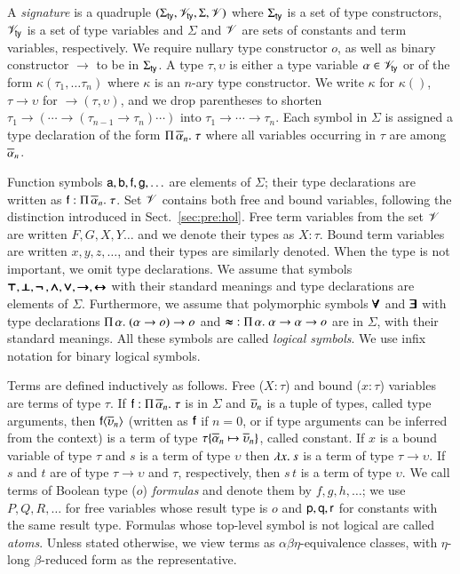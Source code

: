 A {\em signature} is a quadruple $(\Sigma_\mathsf{ty}, \mathscr{V}_\mathsf{ty}, \Sigma, \mathscr{V})$ where $\Sigma_\mathsf{ty}$ is a
set of type constructors, $\mathscr{V}_\mathsf{ty}$ is a set of type variables and $\Sigma$ and
$\mathscr{V}$ are sets of constants and term variables, respectively. We require nullary
type constructor $o$, as well as binary constructor $\rightarrow$
to be in $\Sigma_\mathsf{ty}$. A type $\tau, \upsilon$ is either a type variable $\alpha \in
\mathscr{V}_\mathsf{ty}$ or of the form $\kappa(\tau_1, \ldots \tau_n)$ where $\kappa$ is an
$n$-ary type constructor. We write $\kappa$ for $\kappa()$, $\tau \rightarrow
\upsilon$ for $\rightarrow(\tau, \upsilon)$, and we drop parentheses to shorten 
$\tau_1 \rightarrow (\cdots \rightarrow (\tau_{n-1} \rightarrow \tau_n) \cdots)$ into $\tau_1 \rightarrow \cdots \rightarrow
\tau_n$. Each symbol in $\Sigma$ is
assigned a type declaration of the form $\Pi\,\overline{\alpha}_{n}.\; \tau$ where all variables
occurring in $\tau$ are among $\overline{\alpha}_{n}$.

Function symbols $\mathsf{a}, \mathsf{b}, \mathsf{f}, \mathsf{g}, \ldots$ are elements of
$\Sigma$; their type declarations are written as $\mathsf{f} :
\Pi\,\overline{\alpha}_{n}.\; \tau$. Set $\mathscr{V}$ contains both free and bound variables, following
the distinction introduced in Sect.~\ref{sec:pre:hol}. Free term variables from the set $\mathscr{V}$ are written
$F,G,X,Y \ldots$ and we denote their types as $X : \tau$. Bound term variables are written $x,y,z,\ldots$,
and their types are similarly denoted. When the type is not
important, we omit type declarations. We assume that symbols $\pmb{\top},
\pmb{\bot},\pmb{\neg\,},\pmb{\land}, \pmb{\lor},\pmb{\rightarrow},\pmb{\leftrightarrow}$ with their standard meanings and type declarations are elements of
$\Sigma$. Furthermore, we assume that polymorphic symbols $\pmb{\forall}$ and $\pmb{\exists}$
with type declarations $\Pi\,\alpha.\; (\alpha \rightarrow o) \rightarrow o$
and $\pmb{\approx} \; : \Pi\,\alpha.\; {\alpha \rightarrow \alpha \rightarrow o}$ are
in $\Sigma$, with their standard meanings. All these symbols are called \emph{logical
symbols}. We use infix notation for binary logical symbols.

 Terms are defined inductively as follows. Free ($X : \tau$)  and bound ($x : \tau$) variables   are
terms of type $\tau$. If $\mathsf{f} : \Pi\,\overline{\alpha}_{n}.\; \tau$ is in
$\Sigma$ and $\overline{\upsilon}_{n}$ is a tuple of types, called type arguments, then
$\mathsf{f}{\langle\overline{\upsilon}_{n}\rangle}$ (written as $\mathsf{f}$ if $n=0$, or if type
arguments can be inferred from the context) is a term of type $\tau \{
\overline{\alpha}_{n} \mapsto \overline{\upsilon}_{n} \}$, called constant. If $x$ is a bound variable
of type $\tau$ and $s$ is a term of type $\upsilon$ then $\lambda x.\> s$ is a term of type
$\tau \rightarrow \upsilon$. If $s$ and $t$ are of type $\tau \rightarrow \upsilon$ and
$\tau$, respectively, then $s \, t$ is a term of type $\upsilon$. We call terms of
Boolean type ($o$) \emph{formulas} and denote them by $f,g,h, \ldots$; we use
$P,Q,R, \ldots$ for free variables whose result type is $o$ and
$\mathsf{p},\mathsf{q},\mathsf{r}$ for constants with the same result type.
%
Formulas whose top-level symbol is not logical are called \emph{atoms}.
Unless stated otherwise, we view terms as
$\alpha\beta\eta$-equivalence classes, with $\eta$-long $\beta$-reduced form as
the representative. 

